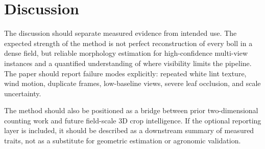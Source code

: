 \section{Discussion}

The discussion should separate measured evidence from intended use. The expected strength of the method is not perfect reconstruction of every boll in a dense field, but reliable morphology estimation for high-confidence multi-view instances and a quantified understanding of where visibility limits the pipeline. The paper should report failure modes explicitly: repeated white lint texture, wind motion, duplicate frames, low-baseline views, severe leaf occlusion, and scale uncertainty.

The method should also be positioned as a bridge between prior two-dimensional counting work and future field-scale 3D crop intelligence. If the optional reporting layer is included, it should be described as a downstream summary of measured traits, not as a substitute for geometric estimation or agronomic validation.
